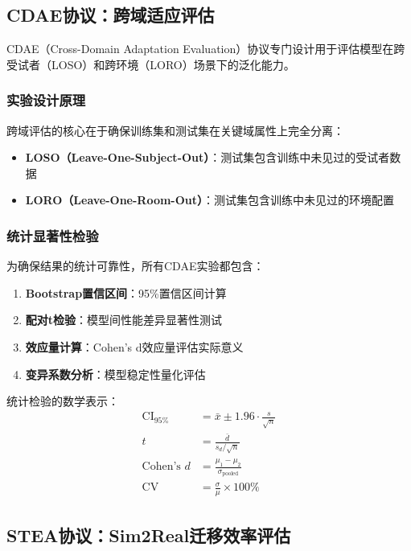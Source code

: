 \subsection{CDAE协议：跨域适应评估}
\label{subsec:cdae_protocol}

CDAE（Cross-Domain Adaptation Evaluation）协议专门设计用于评估模型在跨受试者（LOSO）和跨环境（LORO）场景下的泛化能力。

\subsubsection{实验设计原理}
跨域评估的核心在于确保训练集和测试集在关键域属性上完全分离：

\begin{itemize}
\item \textbf{LOSO（Leave-One-Subject-Out）}：测试集包含训练中未见过的受试者数据
\item \textbf{LORO（Leave-One-Room-Out）}：测试集包含训练中未见过的环境配置
\end{itemize}

\subsubsection{统计显著性检验}
为确保结果的统计可靠性，所有CDAE实验都包含：

\begin{enumerate}
\item \textbf{Bootstrap置信区间}：95\%置信区间计算
\item \textbf{配对t检验}：模型间性能差异显著性测试
\item \textbf{效应量计算}：Cohen's d效应量评估实际意义
\item \textbf{变异系数分析}：模型稳定性量化评估
\end{enumerate}

统计检验的数学表示：
\begin{align}
\text{CI}_{95\%} &= \bar{x} \pm 1.96 \cdot \frac{s}{\sqrt{n}} \\
t &= \frac{\bar{d}}{s_d/\sqrt{n}} \\
\text{Cohen's } d &= \frac{\mu_1 - \mu_2}{\sigma_{\text{pooled}}} \\
\text{CV} &= \frac{\sigma}{\mu} \times 100\%
\end{align}

\subsection{STEA协议：Sim2Real迁移效率评估}
\label{subsec:stea_protocol}

